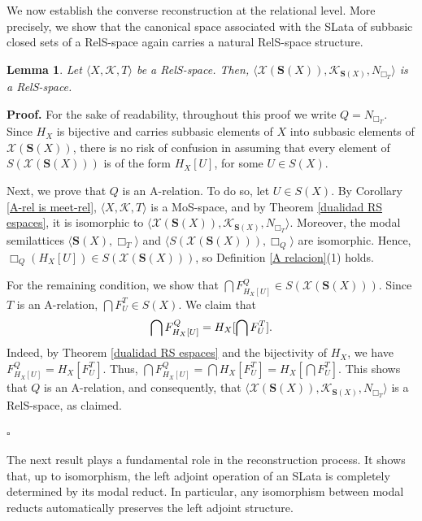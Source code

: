 \documentclass{article}
\newtheorem{lemma}{\bf Lemma}[section]
\newenvironment{proof}
{\par\noindent\textbf{Proof. }\rm}
{\hfill$\boldsymbol{\square}$\par\vspace{0.3cm}}
\begin{document}
We now establish the converse reconstruction at the relational level. More precisely, we show that the canonical space associated with the SLata of subbasic closed sets of a RelS-space again carries a natural RelS-space structure.

\begin{lemma}\label{x(s(X)) es rel space}
    Let $\langle X, \mathcal{K}, T \rangle$ be a RelS-space. Then, $\langle \mathcal{X}(\mathbf{S}(X)),\mathcal{K}_{\mathbf{S}(X)},N_{\Box_T}\rangle$ is a RelS-space.
\end{lemma}

\begin{proof}
    For the sake of readability, throughout this proof we write $Q=N_{\Box_T}$. Since $H_X$ is bijective and carries subbasic elements of $X$ into subbasic elements of $\mathcal{X}(\mathbf{S}(X))$, there is no risk of confusion in assuming that every element of $S(\mathcal{X}(\mathbf{S}(X)))$ is of the form $H_X[U]$, for some $U\in S(X)$.
    
Next, we prove that $Q$ is an A-relation. To do so, let $U\in S(X)$. By Corollary \ref{A-rel is meet-rel}, $\langle X, \mathcal{K}, T \rangle$ is a MoS-space, and by Theorem \ref{dualidad RS espaces}, it is isomorphic to $\langle \mathcal{X}(\mathbf{S}(X)),\mathcal{K}_{\mathbf{S}(X)},N_{\Box_T}\rangle$. Moreover, the modal semilattices $\langle \mathbf{S}(X), \Box_{T}\rangle$ and $\langle S(\mathcal{X}(\mathbf{S}(X))), \Box_Q\rangle$ are isomorphic. Hence, $\Box_Q(H_{X}[U])\in S(\mathcal{X}(\mathbf{S}(X)))$, so Definition \ref{A relacion}(1) holds. 

For the remaining condition, we show that $\bigcap F^Q_{H_X[U]}\in S(\mathcal{X}(\mathbf{S}(X)))$. Since $T$ is an A-relation, $\bigcap F^T_U\in S(X)$. We claim that 
\begin{equation}\label{F_{H_X}}
\bigcap F^Q_{H_X[U]}=H_X[\bigcap F^T_U].
\end{equation}
Indeed, by Theorem \ref{dualidad RS espaces} and the bijectivity of $H_X$, we have $F^Q_{H_X[U]}=H_X[F^T_U]$. Thus, $\bigcap F^Q_{H_X[U]}=\bigcap H_X[F^T_U]=H_X[\bigcap F^T_U]$. This shows that $Q$ is an A-relation, and consequently, that $\langle \mathcal{X}(\mathbf{S}(X)),\mathcal{K}_{\mathbf{S}(X)},N_{\Box_T}\rangle$ is a RelS-space, as claimed.
 
\end{proof}

The next result plays a fundamental role in the reconstruction process. It shows that, up to isomorphism, the left adjoint operation of an SLata is completely determined by its modal reduct. In particular, any isomorphism between modal reducts automatically preserves the left adjoint structure.
\end{document}
